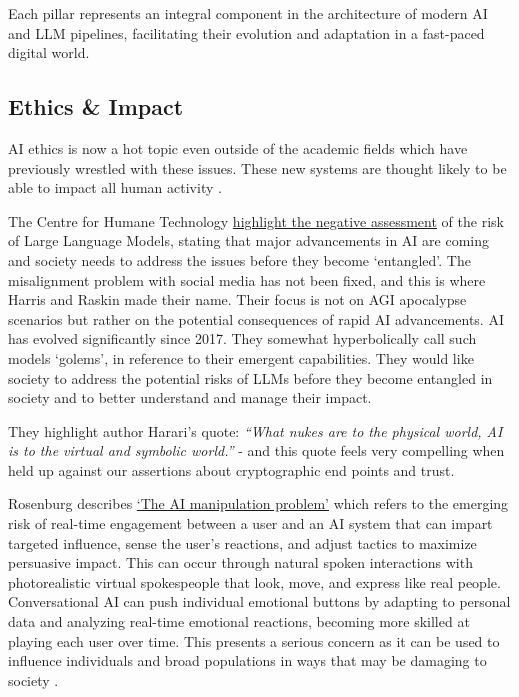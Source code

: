 Each pillar represents an integral component in the architecture of modern AI and LLM pipelines, facilitating their evolution and adaptation in a fast-paced digital world.

\subsection{Ethics \& Impact}
AI ethics is now a hot topic even outside of the academic fields which have previously wrestled with these issues. These new systems are thought likely to be able to impact all human activity \cite{eloundou2023gpts}. \par
The Centre for Humane Technology \href{https://www.humanetech.com/key-issues}{highlight the negative assessment} of the risk of Large Language Models, stating that major advancements in AI are coming and society needs to address the issues before they become `entangled'. The misalignment problem with social media has not been fixed, and this is where Harris and Raskin made their name. Their focus is not on AGI apocalypse scenarios but rather on the potential consequences of rapid AI advancements. AI has evolved significantly since 2017. They somewhat hyperbolically call such models `golems', in reference to their emergent capabilities. They would like society to address the potential risks of LLMs before they become entangled in society and to better understand and manage their impact.\par
They highlight author \cite{harari2014sapiens} Harari's quote: \textit{``What nukes are to the physical world, AI is to the virtual and symbolic world.''} - and this quote feels very compelling when held up against our assertions about cryptographic end points and trust.\par
Rosenburg describes \href{https://bigthink.com/the-present/danger-conversational-ai/}{`The AI manipulation problem'} which refers to the emerging risk of real-time engagement between a user and an AI system that can impart targeted influence, sense the user's reactions, and adjust tactics to maximize persuasive impact. This can occur through natural spoken interactions with photorealistic virtual spokespeople that look, move, and express like real people. Conversational AI can push individual emotional buttons by adapting to personal data and analyzing real-time emotional reactions, becoming more skilled at playing each user over time. This presents a serious concern as it can be used to influence individuals and broad populations in ways that may be damaging to society \cite{Rosenberg2023}. \par
